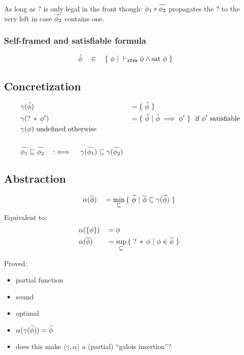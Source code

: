 \documentclass[11pt,a4paper]{article}
\begin{document}
As long as $?$ is only legal in the front though: $\phi_1 * \widetilde{\phi_2}$ propagates the $?$ to the very left in case $\widetilde{\phi_2}$ contains one.

\subsubsection{Self-framed and satisfiable formula}
\begin{align*}
&\hat{\phi} \quad \in \quad \{~ \phi ~|~ \vdash_\texttt{sfrm} \phi \wedge \text{sat~} \phi ~\}
\end{align*}

\subsection{Concretization}
\begin{align*}
&\gamma(\hat{\phi}) ~&&= \{~ \hat{\phi} ~\} \\
&\gamma(?\:*\:\phi') ~&&= \{~ \hat{\phi} ~|~ \hat{\phi} \implies \phi' ~\} \text{~~if $\phi'$ satisfiable} \\
&\gamma(\phi) \text{ undefined otherwise} \\
~\\
&\widetilde{\phi_1} \sqsubseteq \widetilde{\phi_2} \quad:\iff\quad \gamma(\widetilde{\phi_1}) \subseteq \gamma(\widetilde{\phi_2})
\end{align*}



\subsection{Abstraction}
\begin{align*}
&\alpha(\overline{\phi}) &&= \min_{\sqsubseteq} {\{~ \widetilde{\phi} ~|~ \overline{\phi} \subseteq \gamma(\widetilde{\phi}) ~\}}\\
\end{align*}
Equivalent to:
\begin{align*}
&\alpha(\{ \phi \}) &&= \phi\\
&\alpha(\overline{\phi}) &&= \sup_{\sqsubseteq} {\{~ ?\:*\:\phi ~|~ \phi \in \overline{\phi} ~\}}\\
\end{align*}

Proved:
\begin{itemize}
	\item partial function
	\item sound
	\item optimal
	\item $\alpha(\gamma(\widetilde{\phi})) = \widetilde{\phi}$
    \item does this make $\langle \gamma, \alpha \rangle$ a (partial) “galois insertion”?
\end{itemize}
\end{document}
